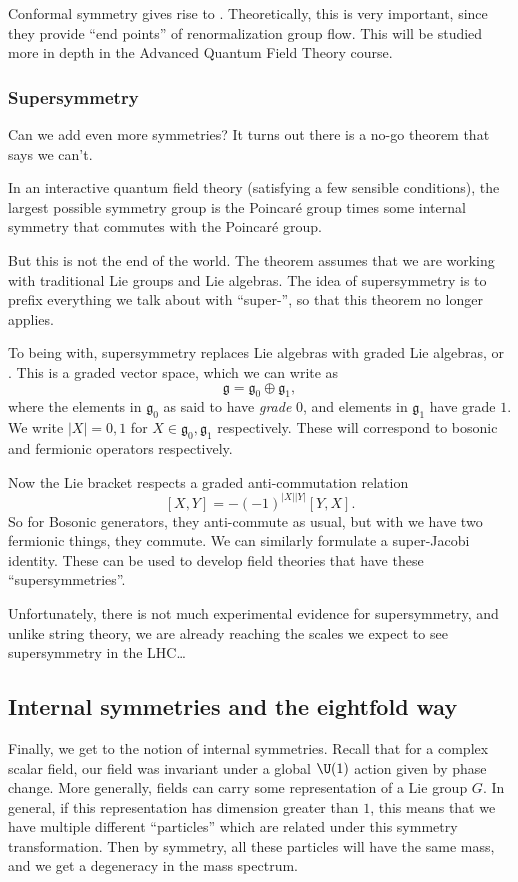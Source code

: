 \documentclass[a4paper]{article}
\begin{document}
Conformal symmetry gives rise to . Theoretically, this is very important, since they provide ``end points'' of renormalization group flow. This will be studied more in depth in the Advanced Quantum Field Theory course.

\subsubsection*{Supersymmetry}
Can we add even more symmetries? It turns out there is a no-go theorem that says we can't.
\begin{thm}
  In an interactive quantum field theory (satisfying a few sensible conditions), the largest possible symmetry group is the Poincar\'e group times some internal symmetry that commutes with the Poincar\'e group.
\end{thm}
But this is not the end of the world. The theorem assumes that we are working with traditional Lie groups and Lie algebras. The idea of supersymmetry is to prefix everything we talk about with ``super-'', so that this theorem no longer applies.

To being with, supersymmetry replaces Lie algebras with graded Lie algebras, or . This is a graded vector space, which we can write as
\[
  \mathfrak{g} = \mathfrak{g}_0 \oplus \mathfrak{g}_1,
\]
where the elements in $\mathfrak{g}_0$ as said to have \emph{grade} $0$, and elements in $\mathfrak{g}_1$ have grade $1$. We write $|X| = 0, 1$ for $X \in \mathfrak{g}_0, \mathfrak{g}_1$ respectively. These will correspond to bosonic and fermionic operators respectively.

Now the Lie bracket respects a graded anti-commutation relation
\[
  [X, Y] = -(-1)^{|X||Y|}[Y, X].
\]
So for Bosonic generators, they anti-commute as usual, but with we have two fermionic things, they commute. We can similarly formulate a super-Jacobi identity. These can be used to develop field theories that have these ``supersymmetries''.

Unfortunately, there is not much experimental evidence for supersymmetry, and unlike string theory, we are already reaching the scales we expect to see supersymmetry in the LHC\ldots

\subsection{Internal symmetries and the eightfold way}
Finally, we get to the notion of internal symmetries. Recall that for a complex scalar field, our field was invariant under a global $\U(1)$ action given by phase change. More generally, fields can carry some representation of a Lie group $G$. In general, if this representation has dimension greater than $1$, this means that we have multiple different ``particles'' which are related under this symmetry transformation. Then by symmetry, all these particles will have the same mass, and we get a degeneracy in the mass spectrum.
\end{document}
